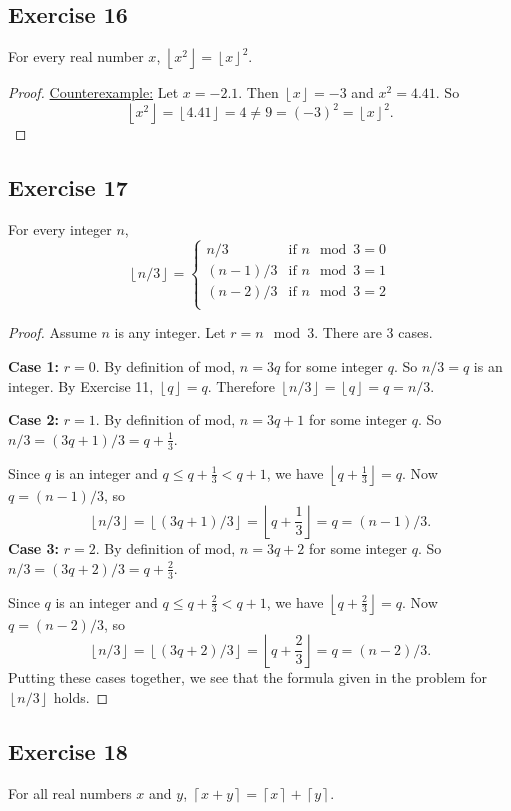 \documentclass[14pt]{extarticle}
\newcommand{\floor}[1]{{\left\lfloor#1\right\rfloor}}
\newcommand{\ceil}[1]{{\left\lceil#1\right\rceil}}
\begin{document}
\subsection{Exercise 16}
For every real number $x$, $\floor{x^2} = \floor{x}^2$.

\begin{proof}
    \underline{Counterexample:} Let $x = -2.1$. Then $\floor{x} = -3$ and $x^2 = 4.41$. So
    \[
        \floor{x^2} = \floor{4.41} = 4 \neq 9 = (-3)^2 = \floor{x}^2.
    \]
\end{proof}

\subsection{Exercise 17}
For every integer $n$,
\[
    \floor{n/3} =
    \left\{
    \begin{array}{lr}
        n/3     & \text{if } n \mod 3 = 0 \\
        (n-1)/3 & \text{if } n \mod 3 = 1 \\
        (n-2)/3 & \text{if } n \mod 3 = 2 \\
    \end{array}
    \right.
\]
\begin{proof}
    Assume $n$ is any integer. Let $r = n \mod 3$. There are 3 cases.

        {\bf Case 1:} $r = 0$. By definition of mod, $n = 3q$ for some integer $q$. So $n/3 = q$ is an integer. By Exercise 11, $\floor{q} = q$. Therefore $\floor{n/3} = \floor{q} = q = n / 3$.

        {\bf Case 2:} $r = 1$. By definition of mod, $n = 3q + 1$ for some integer $q$. So $n/3 = (3q+1)/3 = q + \frac{1}{3}$.

    Since $q$ is an integer and $q \leq q + \frac{1}{3} < q+1$, we have $\floor{q+\frac{1}{3}} = q$. Now $q = (n-1)/3$, so
    \[
        \floor{n/3} = \floor{(3q+1)/3} = \floor{q+\frac{1}{3}} = q = (n-1)/3.
    \]
    {\bf Case 3:} $r = 2$. By definition of mod, $n = 3q + 2$ for some integer $q$. So $n/3 = (3q+2)/3 = q + \frac{2}{3}$.

    Since $q$ is an integer and $q \leq q + \frac{2}{3} < q+1$, we have $\floor{q+\frac{2}{3}} = q$. Now $q = (n-2)/3$, so
    \[
        \floor{n/3} = \floor{(3q+2)/3} = \floor{q+\frac{2}{3}} = q = (n-2)/3.
    \]
    Putting these cases together, we see that the formula given in the problem for $\floor{n/3}$ holds.
\end{proof}

\subsection{Exercise 18}
For all real numbers $x$ and $y$, $\ceil{x + y} = \ceil{x} + \ceil{y}$.
\end{document}
